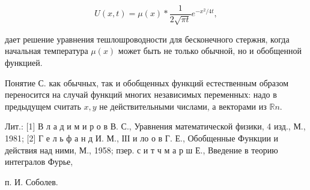 \documentclass[10pt]{article}
\begin{document}
\[

U(x, t)=\mu(x) * \frac{1}{2 \sqrt{\pi t}} e^{-x^{2} / 4 t},

\]



дает решение уравнения тешлошроводности для бесконечного стержня, когда начальная температура $\mu(x)$ может быть не только обычной, но и обобщенной функцией.



Понятие С. как обычных, так и обобщенных функций естественным образом переносится на случай функций многих независимых переменных: надо в предыдущем считать $x, y$ не действительными числами, а векторами из $\mathbb{R} n$.



Лит.: [1] В л а д и м и р о в В. С., Уравнения математической физики, 4 изд., М., 1981; [2] Г е л ь ф а н д И. М., ІІІ и ло о в Г. Е., Обобщенные Функции и действия над ними, М., 1958; пзер. с и т ч м а р ш Е., Введение в теорию интегралов Фурье,

п. И. Соболев.
\end{document}
